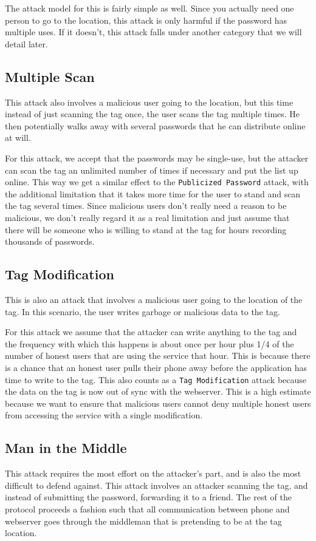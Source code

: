 \documentclass{sig-alternate}
\begin{document}
The attack model for this is fairly simple as well. Since you actually
need one person to go to the location, this attack is only harmful if
the password has multiple uses. If it doesn't, this attack falls under
another category that we will detail later.

\subsection{Multiple Scan}
This attack also involves a malicious user going to the location, but
this time instead of just scanning the tag once, the user scans the
tag multiple times. He then potentially walks away with several
passwords that he can distribute online at will.

For this attack, we accept that the passwords may be single-use, but
the attacker can scan the tag an unlimited number of times if
necessary and put the list up online. This way we get a similar effect
to the \texttt{Publicized Password} attack, with the additional
limitation that it takes more time for the user to stand and scan the
tag several times. Since malicious users don't really need a reason to
be malicious, we don't really regard it as a real limitation and just
assume that there will be someone who is willing to stand at the tag
for hours recording thousands of passwords.

\subsection{Tag Modification}
This is also an attack that involves a malicious user going to the
location of the tag. In this scenario, the user writes garbage or
malicious data to the tag. 

For this attack we assume that the attacker can write anything to the
tag and the frequency with which this happens is about once per hour
plus 1/4 of the number of honest users that are using the service that
hour. This is because there is a chance that an honest user pulls
their phone away before the application has time to write to the
tag. This also counts as a \texttt{Tag Modification} attack because
the data on the tag is now out of sync with the webserver. This is a
high estimate because we want to ensure that malicious users cannot
deny multiple honest users from accessing the service with a single
modification.

\subsection{Man in the Middle}
This attack requires the most effort on the attacker's part, and is
also the most difficult to defend against. This attack involves an
attacker scanning the tag, and instead of submitting the password,
forwarding it to a friend. The rest of the protocol proceeds a fashion
such that all communication between phone and webserver goes through
the middleman that is pretending to be at the tag location.
\end{document}
